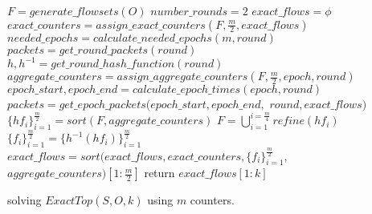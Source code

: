 \begin{algorithm}\small
    $F = generate\_flowsets(O)$\;
    $number\_rounds=2$\; $exact\_flows=\phi$\;
    {
        $exact\_counters=assign\_exact\_counters(F, \frac{m}{2}, exact\_flows)$\;
        $needed\_epochs=calculate\_needed\_epochs(m, round)$\;
        $packets=get\_round\_packets(round)$\;
        $h, h^{-1}=get\_round\_hash\_function(round)$\;
        {
            $aggregate\_counters=assign\_aggregate\_counters(F, \frac{m}{2}, epoch, round)$\;
            $epoch\_start, epoch\_end=calculate\_epoch\_times(epoch, round)$\;
            $packets=get\_epoch\_packets(epoch\_start, epoch\_end,$
            $ round, exact\_flows)$\;
            $\{hf_i\}^{\frac{m}{2}}_{i=1}=sort(F, aggregate\_counters)$\;
            $F=\bigcup_{i=1}^{i=\frac{m}{4}}refine(hf_i)$\;
        }
        $\{f_i\}^{\frac{m}{2}}_{i=1}=\{h^{-1}(hf_i)\}^{\frac{m}{2}}_{i=1}$\;
        $exact\_flows=sort(exact\_flows, exact\_counters, \{f_i\}^{\frac{m}{2}}_{i=1},$
        $aggregate\_counters)[1:\frac{m}{2}]$\;
    }
    return $exact\_flows[1:k]$
    \caption{solving $ExactTop(S,O,k)$ using $m$ counters.}
    \label{algo:HashNodeExactTop}
\end{algorithm}
